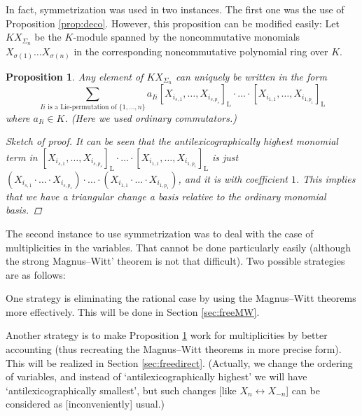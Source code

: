 \documentclass[11pt,a4paper]{amsart}
\newcommand{\plabel}[1]{ \label{#1}}
\newcommand{\snewpage}{}
\newcommand{\plabel}[1]{ \label{#1}\rlap{\smash{${}^{^{[#1]}}$}}}
\newcommand{\snewpage}{\newpage}
\newcommand{\plabel}[1]{ \label{#1}}
\newcommand{\snewpage}{}
\theoremstyle{definition}
\theoremstyle{plain}
\newtheorem{prop}[point]{Proposition}
\begin{document}
In fact, symmetrization was used in two instances.
The first one was the use of Proposition \ref{prop:deco}.
However, this proposition can be modified easily:
Let $KX_{\Sigma_n}$ be the $K$-module spanned by the noncommutative monomials
$X_{\sigma(1)}\ldots X_{\sigma(n)}$ in the corresponding noncommutative polynomial ring over $  K$.
\begin{prop}\plabel{prop:decovar}
Any element of $KX_{\Sigma_n}$ can uniquely be written in the form
\[
\sum_{Ii\text{ is a Lie-permutation of }\{1,\ldots,n\}} a_{Ii}
[X_{i_{s,1}},\ldots,X_{i_{s,p_s}}]_{\mathrm L}\cdot \ldots \cdot[X_{i_{1,1}},\ldots,X_{i_{1,p_1}}]_{\mathrm L}
\]
 where $a_{Ii}\in K$.
(Here we used ordinary commutators.)
\begin{proof}[Sketch of proof]
It can be seen that the antilexicographically highest monomial term in
$[X_{i_{s,1}},\ldots,X_{i_{s,p_s}}]_{\mathrm L}\cdot \ldots \cdot[X_{i_{1,1}},\ldots,X_{i_{1,p_1}}]_{\mathrm L}$
 is just $(X_{i_{s,1}}\cdot\ldots\cdot X_{i_{s,p_s}})\cdot \ldots \cdot(X_{i_{1,1}}\cdot\ldots\cdot X_{i_{1,p_1}})$,
 and it is with coefficient $1$.
This implies that we have a triangular change a basis relative to the ordinary monomial basis.
\end{proof}
\end{prop}
The second instance to use symmetrization was to deal with the case of multiplicities in the variables.
That cannot be done particularly easily (although the strong Magnus--Witt' theorem is not that difficult).
Two possible strategies are as follows:

One strategy is eliminating the rational case by using the Magnus--Witt theorems more effectively.
This will be done in Section \ref{sec:freeMW}.

Another strategy is to make Proposition \ref{prop:decovar} work for multiplicities by better accounting
 (thus recreating the Magnus--Witt theorems in more precise form).
This will be realized in Section \ref{sec:freedirect}. (Actually, we change the ordering of variables,
 and instead of `antilexicographically highest' we will have `antilexicographically smallest',
 but such changes [like $X_{n}\leftrightarrow X_{-n}$] can be considered as [inconveniently] usual.)
\snewpage
\end{document}
